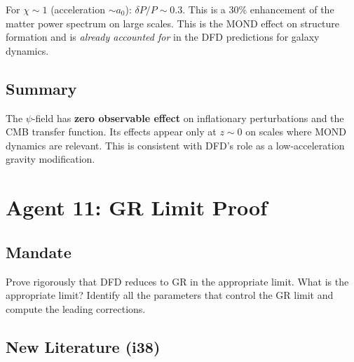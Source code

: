 \documentclass[11pt,a4paper]{article}
\begin{document}
For $\chi \sim 1$ (acceleration $\sim a_0$): $\delta P/P \sim 0.3$. This is a 30\% enhancement of the matter power spectrum on large scales. This is the MOND effect on structure formation and is \emph{already accounted for} in the DFD predictions for galaxy dynamics.

\subsection{Summary}

The $\psi$-field has \textbf{zero observable effect} on inflationary perturbations and the CMB transfer function. Its effects appear only at $z \sim 0$ on scales where MOND dynamics are relevant. This is consistent with DFD's role as a low-acceleration gravity modification.


\newpage
\section{Agent 11: GR Limit Proof}
\label{sec:agent11}

\subsection{Mandate}

Prove rigorously that DFD reduces to GR in the appropriate limit. What is the appropriate limit? Identify all the parameters that control the GR limit and compute the leading corrections.

\subsection{New Literature (i38)}
\end{document}
